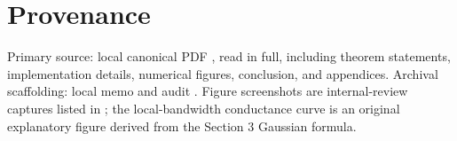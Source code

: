\documentclass[11pt]{article}
\begin{document}
\section*{Provenance}

Primary source: local canonical PDF
,
read in full, including theorem statements, implementation details, numerical
figures, conclusion, and appendices.  Archival scaffolding: local memo
and audit
.
Figure screenshots are internal-review captures listed in
; the local-bandwidth conductance curve is
an original explanatory figure derived from the Section 3 Gaussian formula.



\end{document}
